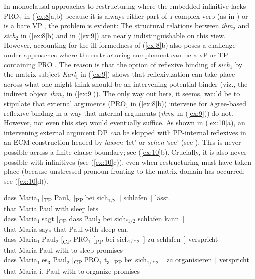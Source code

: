 \documentclass[output=paper]{langsci/langscibook}
\begin{document}
In monoclausal approaches to restructuring where the embedded infinitive lacks
PRO$_1$ in (\ref{ex:8}a,b) because it is always either part of a complex verb
(as in \citealt{Haider:10}) or is a bare VP \parencite{Sternefeld:06}, the
problem is evident: The structural relations between {\it ihm}$_2$ and {\it
sich}$_2$ in (\ref{ex:8}b) and in (\ref{ex:9}) are nearly indistinguishable on
this view.  However, accounting for the ill-formedness of (\ref{ex:8}b) also
poses a challenge under approaches where the restructuring complement can be a
vP or TP containing PRO \parencite{Wurmbrand:01}. The reason is that the option of
reflexive binding of {\it sich}$_1$ by the matrix subject {\it Karl}$_1$ in
(\ref{ex:9}) shows that reflexivization can take place across what one might
think should be an intervening potential binder (viz., the indirect object {\it
ihm}$_2$ in (\ref{ex:9})). The only way out here, it seems, would be to
stipulate that external arguments (PRO$_1$ in (\ref{ex:8}b)) intervene for
Agree-based reflexive binding in a way that internal arguments ({\it ihm}$_2$
in (\ref{ex:9})) do not. However, not even this step would eventually suffice.
As shown in (\ref{ex:10}a), an intervening external argument DP {\it can} be
skipped with PP-internal reflexives in an ECM construction headed by {\it
lassen} \enquote*{let} or {\it sehen} \enquote*{see} (see
\citealt{Reis:76,Grewendorf:83,Fanselow:87,Gunkel:03:inf,Barnickel:14}). This
is never possible across a finite clause boundary; see (\ref{ex:10}b).
Crucially, it is also never possible with  infinitives (see
(\ref{ex:10}c)), even when restructuring must have taken place (because
unstressed pronoun fronting to the matrix domain has occurred; see
(\ref{ex:10}d)).\newpage

\ea\label{ex:10} 
    \ea \gll dass Maria$_1$ [\textsubscript{TP} Paul$_2$ [\textsubscript{PP} bei sich$_{1/2}$~] schlafen~] lässt\\
    that Maria\textsubscript{\Nom}  {} Paul\textsubscript{\Acc} {} with \Refl{} sleep lets\\
    \ex \gll dass Maria$_1$ sagt [\textsubscript{CP} dass Paul$_2$ bei sich$_{*1/2}$ schlafen
      kann~]\\
    that Maria\textsubscript{\Nom} says {} that Paul\textsubscript{\Nom} with \Refl{} sleep can\\
    \ex \gll dass Maria$_1$ Paul$_2$ [\textsubscript{CP} PRO$_1$ [\textsubscript{PP} bei sich$_{1/*2}$~] zu schlafen~]
    verspricht\\
    that Maria\textsubscript{\Nom} Paul\textsubscript{\Dat} {} {} {}  with \Refl{} to sleep
    promises\\
    \ex \gll dass Maria$_1$ es$_3$ Paul$_2$ [\textsubscript{CP} PRO$_1$ t$_3$ [\textsubscript{PP} bei sich$_{1/*2}$~] zu
      organisieren~] verspricht\\
    that Maria\textsubscript{\Nom} it\textsubscript{\Acc} Paul\textsubscript{\Dat} {} {} {} {} with \Refl{} to organize promises\\
    \z
\z
\end{document}
